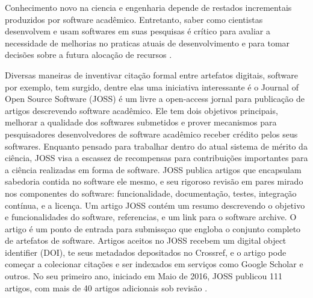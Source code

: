 Conhecimento novo na ciencia e engenharia depende de restados incrementais
produzidos por software acadêmico. Entretanto, saber como cientistas
desenvolvem e usam softwares em suas pesquisas é crítico para avaliar a
necessidade de melhorias no praticas atuais de desenvolvimento e para tomar
decisões sobre a futura alocação de recursos \cite{hannay2009scientists}.


Diversas maneiras de inventivar citação formal entre artefatos digitais,
software por exemplo, tem surgido, dentre elas uma iniciativa interessante
é o Journal of Open Source Software (JOSS) é um livre a open-access jornal para
publicação de artigos descrevendo software acadêmico. Ele tem dois objetivos
principais, melhorar a qualidade dos softwares submetidos e prover mecanismos
para pesquisadores desenvolvedores de software acadêmico receber crédito pelos
seus softwares. Enquanto pensado para trabalhar dentro do atual sistema de
mérito da ciência, JOSS visa a escassez de recompensas para contribuições
importantes para a ciência realizadas em forma de software. JOSS publica
artigos que encapsulam sabedoria contida no software ele mesmo, e seu rigoroso
revisão em pares mirado nos componentes do software: funcionalidade,
documentação, testes, integração contínua, e a licença. Um artigo JOSS contém
um resumo descrevendo o objetivo e funcionalidades do software, referencias, e
um link para o software archive.  O artigo é um ponto de entrada para
submissçao que engloba o conjunto completo de artefatos de software. Artigos
aceitos no JOSS recebem um digital object identifier (DOI), te seus metadados
depositados no Crossref, e o artigo pode começar a colecionar citações e ser
indexados em serviços como Google Scholar e outros. No seu primeiro ano,
iniciado em Maio de 2016, JOSS publicou 111 artigos, com mais de 40 artigos
adicionais sob revisão \cite{smith2017journal}.

